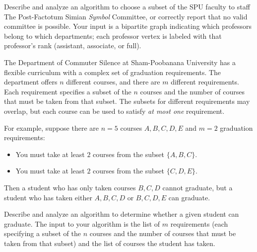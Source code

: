 \begin{exercises}
Describe and analyze an algorithm to choose a subset of the SPU faculty to staff The Post-Factotum Simian  \textit{Symbol} Committee, or correctly report that no valid committee is possible.
Your input is a bipartite graph indicating which professors belong to which departments; each professor vertex is labeled with that professor’s rank (assistant, associate, or full).

\item
\label{ex:11.13}
The Department of Commuter Silence at Sham-Poobanana University has a flexible curriculum with a complex set of graduation requirements.
The department offers $n$ different courses, and there are $m$ different requirements.
Each requirement specifies a subset of the $n$ courses and the number of courses that must be taken from that subset.
The subsets for different requirements may overlap, but each course can be used to satisfy \textit{at most one} requirement.

For example, suppose there are $n = 5$ courses $A, B, C, D, E$ and $m = 2$ graduation requirements:
\begin{itemize}
\item You must take at least $2$ courses from the subset $\{A, B, C\}$.
\item You must take at least $2$ courses from the subset $\{C, D, E\}$.
\end{itemize}
Then a student who has only taken courses $B, C, D$ cannot graduate, but a student who has taken either $A, B, C, D$ or $B, C, D, E$ can graduate.

Describe and analyze an algorithm to determine whether a given student can graduate.
The input to your algorithm is the list of $m$ requirements (each specifying a subset of the $n$ courses and the number of courses that must be taken from that subset) and the list of courses the student has taken.


\end{exercises}

